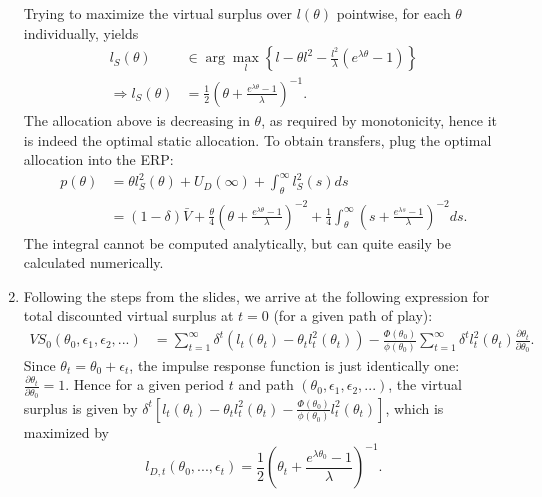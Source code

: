 \documentclass[a4paper]{article}
\begin{document}
\begin{enumerate}
		Trying to maximize the virtual surplus over $l(\theta)$ pointwise, for each $\theta$ individually, yields
		\begin{align*}
			l_{S}(\theta) &\in \arg \max_l \left\{ l - \theta l^2 - \frac{l^2}{\lambda} (e^{\lambda\theta}-1) \right\}
			\\
			\Rightarrow l_{S}(\theta) &= \frac{1}{2} \left( \theta + \frac{e^{\lambda\theta}-1}{\lambda} \right)^{-1}.
		\end{align*}
		The allocation above is decreasing in $\theta$, as required by monotonicity, hence it is indeed the optimal static allocation.
		To obtain transfers, plug the optimal allocation into the ERP:
		\begin{align*}
			p(\theta) &= \theta l_S^2(\theta) + U_D(\infty) + \int_\theta^\infty l_S^2(s) ds
			\\
			&= (1-\delta) \bar{V} + \frac{\theta}{4} \left( \theta + \frac{e^{\lambda\theta}-1}{\lambda} \right)^{-2} + \frac{1}{4} \int_{\theta}^{\infty} \left( s + \frac{e^{\lambda s}-1}{\lambda} \right)^{-2} ds.
		\end{align*}
		The integral cannot be computed analytically, but can quite easily be calculated numerically.
		
		\item Following the steps from the slides, we arrive at the following expression for total discounted virtual surplus at $t=0$ (for a given path of play):
		\begin{align*}
			VS_0(\theta_0, \epsilon_1, \epsilon_2, ...) &= \sum_{t=1}^\infty \delta^t \left( l_t(\theta_t)-\theta_t l_t^2(\theta_t) \right) - \frac{\Phi(\theta_0)}{\phi(\theta_0)} \sum_{t=1}^\infty \delta^t l_t^2(\theta_t) \frac{\partial \theta_t}{\partial \theta_0}.
		\end{align*}
		Since $\theta_t = \theta_0 + \epsilon_t$, the impulse response function is just identically one: $\frac{\partial \theta_t}{\partial \theta_0} = 1$. Hence for a given period $t$ and path $(\theta_0, \epsilon_1, \epsilon_2, ...)$, the virtual surplus is given by $\delta^t \left[ l_t(\theta_t) - \theta_t l_t^2(\theta_t) - \frac{\Phi(\theta_0)}{\phi(\theta_0)} l_t^2(\theta_t) \right]$, which is maximized by $$l_{D,t}(\theta_0,...,\epsilon_t) = \frac{1}{2} \left( \theta_t + \frac{e^{\lambda\theta_0}-1}{\lambda} \right)^{-1}.$$
		

\end{enumerate}
\end{document}
